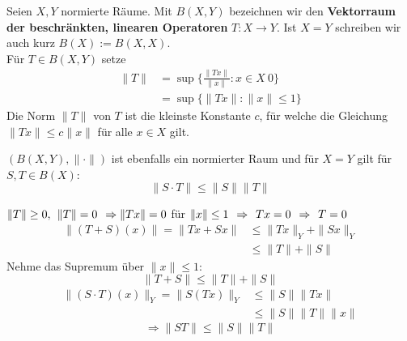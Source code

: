 \begin{definition} 
	Seien $X, Y$ normierte Räume. Mit $B(X, Y)$ bezeichnen wir den \textbf{Vektorraum der beschränkten, linearen Operatoren} $T: X \rightarrow Y$. Ist $ X = Y$ schreiben wir auch kurz $B(X) := B(X, X)$. \\
	
	Für $T \in B(X, Y)$ setze
	\begin{align*}
		\| T \| & = \sup \{ \frac{\| Tx \|}{\| x \|}: x \in X \ {0} \} \\
				& = \sup \{ \| Tx \|: \| x \| \leq 1 \}
	\end{align*}
	Die Norm $\| T \|$ von $T$ ist die kleinste Konstante $c$, für welche die Gleichung $\| Tx \| \leq c \| x \|$ für alle $x \in X$ gilt.
\end{definition}

\begin{satz}
 	$(B(X, Y), \| \cdot \|)$ ist ebenfalls ein normierter Raum und für $X = Y$ gilt für $S, T \in B(X)$:
 	\[ \| S \cdotp T \| \leq \| S \| \| T \| \]
\end{satz}
\begin{beweis}
	$\| T \| \geq 0, \hspace{0.15cm} \| T \| = 0 \hspace{0.15cm} \Rightarrow \| Tx \| = 0$ für $\| x \| \leq 1 \hspace{0.15cm} \Rightarrow \hspace{0.15cm} Tx = 0 \hspace{0.15cm} \Rightarrow \hspace{0.15cm} T = 0$ \\
	\begin{align*}
		\| ( T + S )(x) \| = \| Tx + Sx \| &\leq \| Tx \|_{Y} + \| Sx \|_{Y} \\
										   &\leq \| T \| + \| S \|
	\end{align*}
	Nehme das Supremum über $\| x \| \leq 1$:
	\[ \| T + S \| \leq \| T \| + \| S \| \]
	\begin{align*}
		\| ( S \cdot T )(x) \|_{Y} = \| S(Tx) \|_{Y} & \leq \| S \| \| Tx \| \\
													 & \leq \| S \| \| T \| \| x \|
	\end{align*}
	\[ \Rightarrow \| S T \| \leq \| S \| \| T \| \]
\end{beweis}


